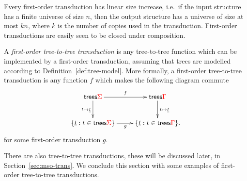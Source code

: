Every first-order  transduction has linear size increase, i.e.~if the input structure has a finite universe of size $n$, then the output structure has a universe of size at most $kn$, where $k$ is the number of copies used in the transduction. First-order transductions are easily seen to be closed under composition.

\begin{definition}
    A \emph{first-order tree-to-tree transduction} is any tree-to-tree  function which can be implemented by a first-order transduction, assuming that trees are modelled according to Definition~\ref{def:tree-model}. More formally, a first-order tree-to-tree transduction is any function $f$ which makes the following diagram commute
    \begin{align*}
        \xymatrix{
            \trees \rSigma \ar[d]_{t \mapsto \underline t}\ar[r]^f & \trees \rGamma \ar[d]^{t \mapsto \underline t} \\
            \set{\underline t : t \in \trees \rSigma} \ar[r]_g & \set{\underline t : t \in \trees \rGamma}.
        } 
    \end{align*}
for some first-order transduction $g$.     
\end{definition}


There are also \mso tree-to-tree transductions, these will be discussed later, in Section~\ref{sec:mso-trans}.  We conclude this section with some examples of first-order tree-to-tree transductions.

